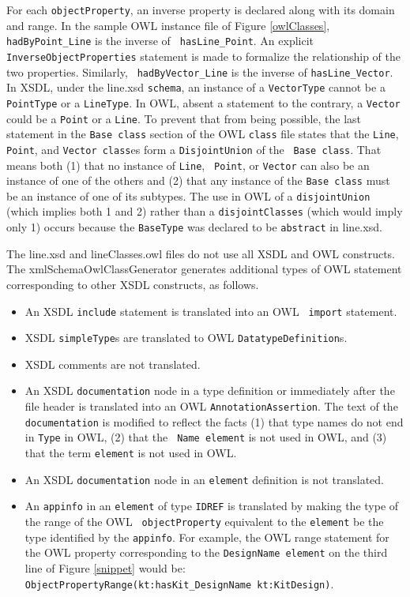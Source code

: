 \documentclass[preprint,12pt]{elsarticle}
\begin{document}
For each {\tt objectProperty}, an inverse property is declared along with
its domain and range. In the sample OWL instance file of Figure
\ref{owlClasses}, {\tt hadByPoint\_Line} is the inverse of {\tt
  hasLine\_Point}. An explicit {\tt InverseObjectProperties} statement is
made to formalize the relationship of the two properties. Similarly, {\tt
  hadByVector\_Line} is the inverse of {\tt hasLine\_Vector}. In XSDL,
under the line.xsd {\tt schema}, an instance of a {\tt VectorType} cannot
be a {\tt PointType} or a {\tt LineType}. In OWL, absent a statement to the
contrary, a {\tt Vector} could be a {\tt Point} or a {\tt Line}. To prevent
that from being possible, the last statement in the {\tt Base class}
section of the OWL {\tt class} file states that the {\tt Line}, {\tt
  Point}, and {\tt Vector class}es form a {\tt DisjointUnion} of the {\tt
  Base class}. That means both (1) that no instance of {\tt Line}, {\tt
  Point}, or {\tt Vector} can also be an instance of one of the others and
(2) that any instance of the {\tt Base class} must be an instance of one of
its subtypes. The use in OWL of a {\tt disjointUnion} (which implies both 1
and 2) rather than a {\tt disjointClasses} (which would imply only 1)
occurs because the {\tt BaseType} was declared to be {\tt abstract} in
line.xsd.

The line.xsd and lineClasses.owl files do not use all XSDL and OWL
constructs. The xmlSchemaOwlClassGenerator generates additional types of
OWL statement corresponding to other XSDL constructs, as follows.

\begin{itemize}
\item An XSDL {\tt include} statement is translated into an OWL {\tt
  import} statement.
\item XSDL {\tt simpleType}s are translated to OWL {\tt DatatypeDefinition}s.
\item XSDL comments are not translated.
\item An XSDL {\tt documentation} node in a type definition or immediately
  after the file header is translated into an OWL {\tt AnnotationAssertion}.
  The text of the {\tt documentation} is modified to reflect the facts
  (1) that type names do not end in {\tt Type} in OWL, (2) that the {\tt
    Name element} is not used in OWL, and (3) that the term {\tt element}
  is not used in OWL.
\item An XSDL {\tt documentation} node in an {\tt element} definition is
  not translated.
\item An {\tt appinfo} in an {\tt element} of type {\tt IDREF} is
  translated by making the type of the range of the OWL {\tt
    objectProperty} equivalent to the {\tt element} be the type identified
  by the {\tt appinfo}. For example, the OWL range statement for the OWL
  property corresponding to the {\tt DesignName element} on the third line
  of Figure \ref{snippet}  would be: \\
  {\tt ObjectPropertyRange(kt:hasKit\_DesignName kt:KitDesign)}.
\end{itemize}
\end{document}
